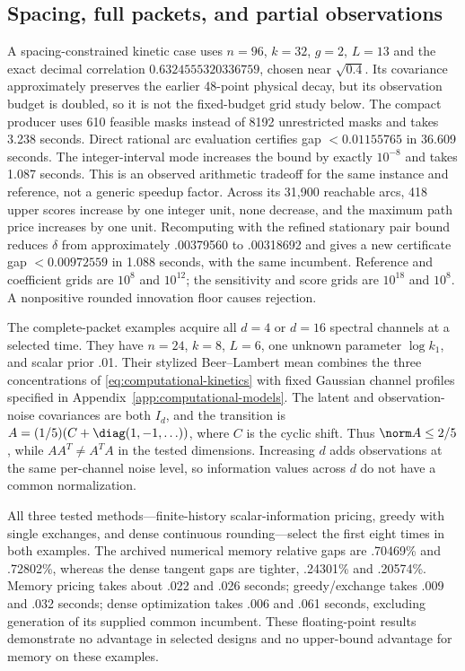 \subsection{Spacing, full packets, and partial observations}
\label{subsec:packet-experiments}

A spacing-constrained kinetic case uses $n=96$, $k=32$, $g=2$, $L=13$ and
the exact decimal correlation $0.6324555320336759$, chosen near $\sqrt{0.4}$.
Its covariance approximately preserves the earlier 48-point physical decay,
but its observation budget is doubled, so it is not the fixed-budget grid study
below. The compact producer uses 610 feasible masks instead of 8192
unrestricted masks and takes 3.238 seconds. Direct rational arc evaluation
certifies gap $<0.01155765$ in 36.609 seconds. The integer-interval mode
increases the bound by exactly $10^{-8}$ and takes 1.087 seconds. This is an
observed arithmetic tradeoff for the same instance and reference, not a generic
speedup factor. Across its 31,900 reachable arcs, 418 upper scores increase
by one integer unit, none decrease, and the maximum path price increases by
one unit. Recomputing with the refined stationary pair bound reduces
$\delta$ from approximately .00379560 to .00318692 and gives a new certificate
gap $<0.00972559$ in 1.088 seconds, with the same incumbent. Reference and
coefficient grids are $10^8$ and $10^{12}$; the sensitivity and score grids are
$10^{18}$ and $10^8$. A nonpositive rounded innovation floor causes rejection.

The complete-packet examples acquire all $d=4$ or $d=16$ spectral channels at
a selected time. They have $n=24$, $k=8$, $L=6$, one unknown parameter
$\log k_1$, and scalar prior .01. Their stylized Beer--Lambert mean combines
the three concentrations of \eqref{eq:computational-kinetics} with fixed
Gaussian channel profiles specified in Appendix~\ref{app:computational-models}.
The latent and observation-noise covariances are both $I_d$, and the transition
is $A=(1/5)(C+\diag(1,-1,\ldots))$, where $C$ is the cyclic shift.
Thus $\norm A\le2/5$, while $AA^T\ne A^TA$ in the tested dimensions.
Increasing $d$ adds observations at the same per-channel noise level, so
information values across $d$ do not have a common normalization.

All three tested methods---finite-history scalar-information pricing,
greedy with single exchanges, and dense continuous rounding---select the
first eight times in both examples. The archived numerical memory relative
gaps are .70469\% and .72802\%, whereas the dense tangent gaps are tighter,
.24301\% and .20574\%. Memory pricing takes about .022 and .026 seconds;
greedy/exchange takes .009 and .032 seconds; dense optimization takes .006 and
.061 seconds, excluding generation of its supplied common incumbent.
These floating-point results demonstrate no advantage in selected designs and
no upper-bound advantage for memory on these examples.


